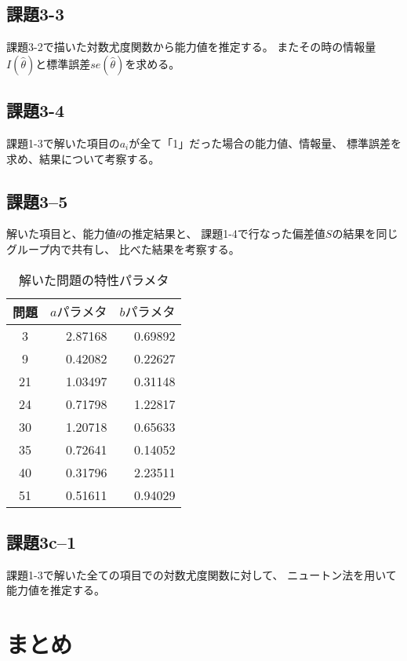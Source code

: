 \documentclass[12pt]{jarticle}
\begin{document}
\subsection{課題3-3}
\begin{shadebox}
    課題3-2で描いた対数尤度関数から能力値を推定する。
    またその時の情報量$I(\hat{\theta})$と標準誤差$se(\hat{\theta})$を求める。
\end{shadebox}

\subsection{課題3-4}
\begin{shadebox}
    課題1-3で解いた項目の$a_i$が全て「1」だった場合の能力値、情報量、
    標準誤差を求め、結果について考察する。
\end{shadebox}


\subsection{課題3–5}
\begin{shadebox}
    解いた項目と、能力値$\theta$の推定結果と、
    課題1-4で行なった偏差値$S$の結果を同じグループ内で共有し、
    比べた結果を考察する。
\end{shadebox}


\begin{table}[htb]
    \begin{center}
        \caption{解いた問題の特性パラメタ}
        \begin{tabular}{|c|r|r|}
            \hline
            問題 & $aパラメタ$ & $bパラメタ$ \\
            \hline
            3    & 2.87168     & 0.69892     \\
            9    & 0.42082     & 0.22627     \\
            21   & 1.03497     & 0.31148     \\
            24   & 0.71798     & 1.22817     \\
            30   & 1.20718     & 0.65633     \\
            35   & 0.72641     & 0.14052     \\
            40   & 0.31796     & 2.23511     \\
            51   & 0.51611     & 0.94029     \\
            \hline
        \end{tabular}
    \end{center}
\end{table}


\subsection{課題3c–1}
\begin{shadebox}
    課題1-3で解いた全ての項目での対数尤度関数に対して、
    ニュートン法を用いて能力値を推定する。
\end{shadebox}


\section{まとめ}



\clearpage
\appendix
\end{document}
